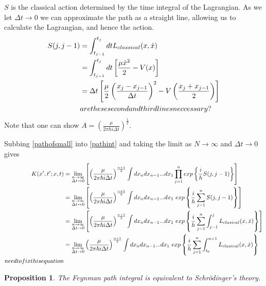\documentclass[11pt, a4paper]{article}
\theoremstyle{definition}
\theoremstyle{plain}
\newtheorem{prop}[defn]{Proposition}
\begin{document}
$S$ is the classical action determined by the time integral 
of the Lagrangian. As we let $\Delta t \longrightarrow 0$ we 
can approximate the path as a straight line, allowing us to 
calculate the Lagrangian, and hence the action.
\begin{align}
    S(j,j-1) &= \int^{t_j}_{t_{j-1}} dt L_{classical}(x, \dot{x}) \notag \\
    &= \int^{t_j}_{t_{j-1}} dt \left[ \frac{\mu \dot{x}^2}{2} - V(x) \right] \notag \\
    &= \Delta t \left[ \frac{\mu}{2} \left(\frac{x_j - x_{j-1}}{\Delta t} \right)^2 
    - V \left(\frac{x_j + x_{j-1}}{2} \right) \right] \\
    &are these second and third lines neccessary? \notag
\end{align}
Note that one can show $A = \left(\frac{\mu}{2 \pi \hbar i \Delta t} \right)^{\frac{1}{2}}$.

Subbing \eqref{pathofsmall} into \eqref{pathint} and 
taking the limit as $N \longrightarrow \infty$ and 
$\Delta t \longrightarrow 0$ gives
\begin{align}
K(x',t';x,t) &= \lim_{\substack{n \to \infty \\ \Delta t \to 0}} \left[ \left(\frac{\mu}{2 \pi \hbar i \Delta t} \right)^{\frac{n+1}{2}}
\int dx_{n}dx_{n-1}...dx_1 \prod_{j=1}^{n}exp \left\{\frac{i}{h}S(j,j-1)\right\} \right] \notag\\
&= \lim_{\substack{n \to \infty \\ \Delta t \to 0}} \left[ \left(\frac{\mu}{2 \pi \hbar i \Delta t} \right)^{\frac{n+1}{2}}
\int dx_{n}dx_{n-1}...dx_1 \ exp \left\{ \frac{i}{h} \sum_{j=1}^n S(j,j-1)\right\} \right] \notag\\
&= \lim_{\substack{n \to \infty \\ \Delta t \to 0}} \left[ \left(\frac{\mu}{2 \pi \hbar i \Delta t} \right)^{\frac{n+1}{2}}
\int dx_{n}dx_{n-1}...dx_1 \ exp \left\{ \frac{i}{h} \sum_{j=1}^n \int_{j-1}^{j} L_{clasical}(x, \dot{x})\right\} \right] \notag\\
&= \lim_{\substack{n \to \infty \\ \Delta t \to 0}} \left(\frac{\mu}{2 \pi \hbar i \Delta t} \right)^{\frac{n+1}{2}}
\int dx_{n}dx_{n-1}...dx_1 \ exp \left\{ \frac{i}{h} \sum_{j=1}^n \int_{t_0}^{n+1} L_{clasical}(x, \dot{x})\right\}
\\need to fix this equation
\end{align}

\begin{prop}
The Feynman path integral is equivalent to Schrödinger's theory.
\end{prop}
\end{document}
